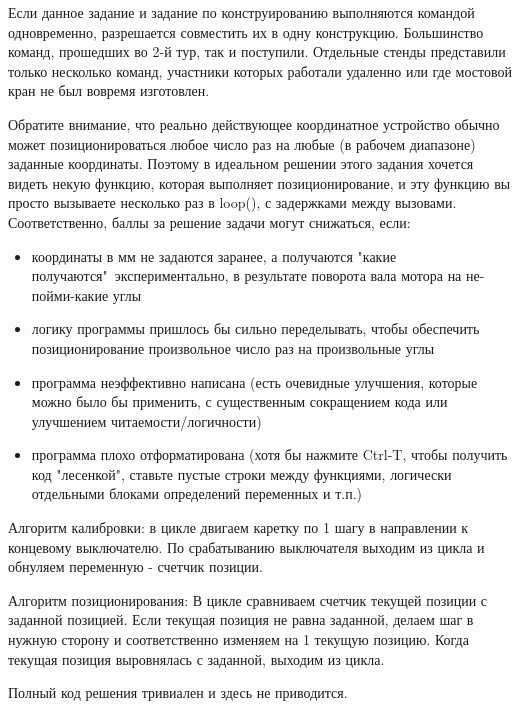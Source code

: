 Если данное задание и задание по конструированию выполняются командой одновременно, разрешается совместить их в одну конструкцию. Большинство команд, прошедших во 2-й тур, так и поступили.  Отдельные стенды представили только несколько команд, участники которых работали удаленно или где мостовой кран не был вовремя изготовлен.

Обратите внимание,  что реально действующее координатное устройство обычно может позиционироваться любое число раз на любые (в рабочем диапазоне) заданные координаты.  Поэтому в идеальном решении этого задания хочется видеть некую функцию, которая выполняет позиционирование, и эту функцию вы просто вызываете несколько раз в loop(), с задержками между вызовами.  Соответственно, баллы за решение задачи могут снижаться, если:
\begin{itemize}
    \item координаты в мм не задаются заранее, а получаются "какие получаются"\ экспериментально, в результате поворота вала мотора на не-пойми-какие  углы
    \item логику программы пришлось бы сильно переделывать,  чтобы обеспечить позиционирование произвольное число раз на произвольные углы
    \item программа неэффективно написана  (есть очевидные улучшения, которые можно было бы применить, с существенным сокращением кода или улучшением читаемости/логичности)
    \item программа плохо отформатирована (хотя бы нажмите Ctrl-T, чтобы получить код "лесенкой"{}, ставьте пустые строки между функциями, логически отдельными блоками определений переменных и т.п.)
\end{itemize}

Алгоритм калибровки: в цикле двигаем каретку по 1 шагу в направлении к концевому выключателю.  По срабатыванию выключателя выходим из цикла и обнуляем переменную - счетчик позиции.

Алгоритм позиционирования: В цикле сравниваем счетчик текущей позиции с заданной позицией. Если текущая позиция не равна заданной, делаем шаг в нужную сторону и соответственно изменяем на 1 текущую позицию. Когда текущая позиция выровнялась с заданной, выходим из цикла.

Полный код решения тривиален и здесь не приводится.